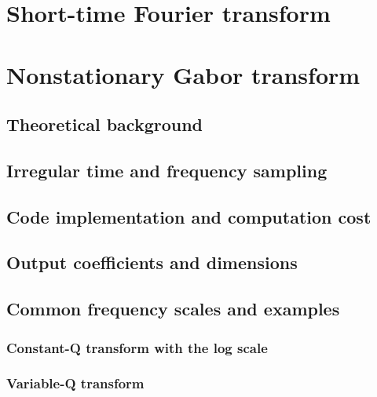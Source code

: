 \documentclass[letter,12pt,notitlepage]{article}
\begin{document}
\vfill
\clearpage

\section{Short-time Fourier transform}
\label{sec:theorystft}

\vfill
\clearpage

\section{Nonstationary Gabor transform}
\label{sec:theorynsgt}

\subsection{Theoretical background}


\subsection{Irregular time and frequency sampling}


\subsection{Code implementation and computation cost}


\subsection{Output coefficients and dimensions}


\subsection{Common frequency scales and examples}

\subsubsection{Constant-Q transform with the log scale}

\subsubsection{Variable-Q transform}
\end{document}
